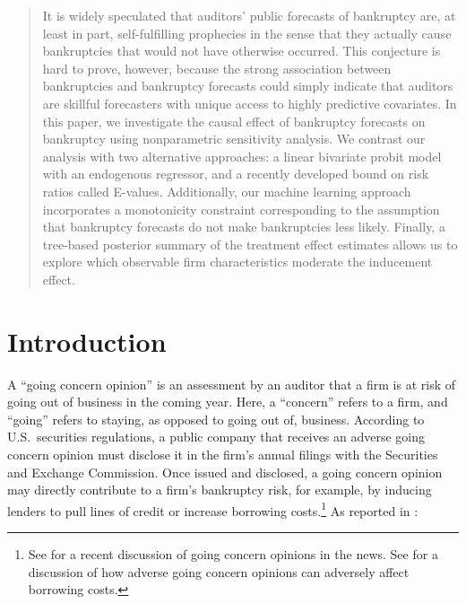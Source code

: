 \documentclass[aoas,preprint, 11pt, dvipsnames, table, x11name]{imsart}
\theoremstyle{remark}
\begin{document}
\begin{frontmatter}
		\begin{abstract}
			It is widely speculated that auditors' public forecasts of bankruptcy are, at least in part, self-fulfilling prophecies in the sense that they actually cause bankruptcies that would not have otherwise occurred. This conjecture is hard to prove, however, because the strong association between bankruptcies and bankruptcy forecasts could simply indicate that auditors are skillful forecasters with unique access to highly predictive covariates. 
			In this paper, we investigate the causal effect of bankruptcy forecasts on bankruptcy using nonparametric sensitivity analysis. We contrast our analysis with two alternative approaches:  a linear bivariate probit model with an endogenous regressor, and a recently developed bound on risk ratios called E-values. Additionally, our machine learning approach incorporates a monotonicity constraint corresponding to the assumption that bankruptcy forecasts do not make bankruptcies less likely. Finally, a tree-based posterior summary of the treatment effect estimates allows us to explore which observable firm characteristics moderate the inducement effect.
		\end{abstract}
		
		\begin{keyword}
		\end{keyword}
		
	\end{frontmatter}
	\section{Introduction}
	A ``going concern opinion'' is an assessment by an auditor that a firm is at risk of going out of business in the coming year. Here, a ``concern'' refers to a firm, and ``going'' refers to staying, as opposed to going out of, business. According to U.S.~securities regulations, a public company that receives an adverse going concern opinion must disclose it in the firm's annual filings with the Securities and Exchange Commission. Once issued and disclosed, a going concern opinion may directly contribute to a firm's bankruptcy risk, for example, by inducing lenders to pull lines of credit or increase borrowing costs.\footnote{See \cite{maurer-wsj-2020} for a recent discussion of going concern opinions in the news. See \cite{Chen-He-Ma-etal-2016} for a discussion of how adverse going concern opinions can adversely affect borrowing costs.} As reported in \cite{maurer-wsj-2020}:
	
\end{document}
